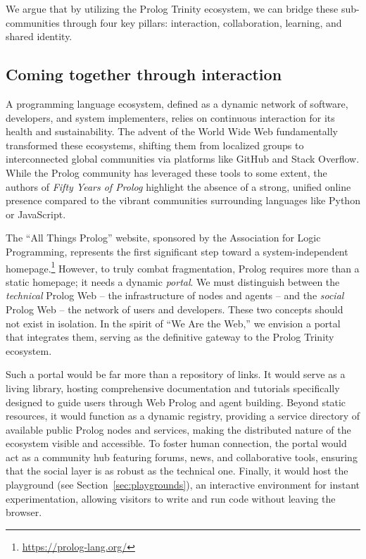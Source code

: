 We argue that by utilizing the Prolog Trinity ecosystem, we can bridge these sub-communities through four key pillars: interaction, collaboration, learning, and shared identity.

\subsection{Coming together through interaction}

A programming language ecosystem, defined as a dynamic network of software, developers, and system implementers, relies on continuous interaction for its health and sustainability. The advent of the World Wide Web fundamentally transformed these ecosystems, shifting them from localized groups to interconnected global communities via platforms like GitHub and Stack Overflow. While the Prolog community has leveraged these tools to some extent, the authors of \textit{Fifty Years of Prolog} highlight the absence of a strong, unified online presence compared to the vibrant communities surrounding languages like Python or JavaScript.

The ``All Things Prolog'' website, sponsored by the Association for Logic Programming, represents the first significant step toward a system-independent homepage.\footnote{\url{https://prolog-lang.org/}} However, to truly combat fragmentation, Prolog requires more than a static homepage; it needs a dynamic \textit{portal}. We must distinguish between the \textit{technical} Prolog Web -- the infrastructure of nodes and agents -- and the \textit{social} Prolog Web -- the network of users and developers. These two concepts should not exist in isolation. In the spirit of ``We Are the Web,'' we envision a portal that integrates them, serving as the definitive gateway to the Prolog Trinity ecosystem.

Such a portal would be far more than a repository of links. It would serve as a living library, hosting comprehensive documentation and tutorials specifically designed to guide users through Web Prolog and agent building. Beyond static resources, it would function as a dynamic registry, providing a service directory of available public Prolog nodes and services, making the distributed nature of the ecosystem visible and accessible. To foster human connection, the portal would act as a community hub featuring forums, news, and collaborative tools, ensuring that the social layer is as robust as the technical one. Finally, it would host the playground (see Section~\ref{sec:playgrounds}), an interactive environment for instant experimentation, allowing visitors to write and run code without leaving the browser.

